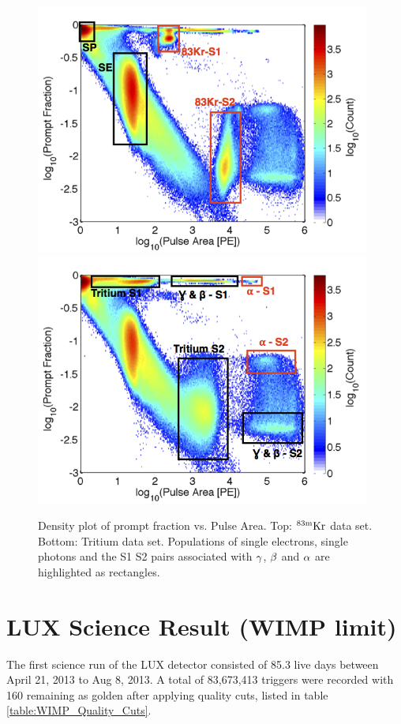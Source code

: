  \begin{figure}[h!]\centering
\includegraphics[width=110mm]{Chapter_LUX_Det/Kr_83_Density_text.png}
\includegraphics[width=110mm]{Chapter_LUX_Det/T_Density_text.png}
\caption{Density plot of prompt fraction vs. Pulse Area. Top: $\rm^{83m}Kr$ data set. Bottom: Tritium data set. Populations of single electrons, single photons and the S1 S2 pairs associated with $\rm \gamma$, $\rm \beta$ and $\rm \alpha$ are highlighted as rectangles.}
\label{fig:Prompt_Fraction}
\end{figure}


\section{LUX Science Result (WIMP limit)}

The first science run of the LUX detector consisted of 85.3 live days between April 21, 2013 to Aug 8, 2013. A total of 83,673,413 triggers were recorded with 160 remaining as golden after applying quality cuts, listed in table \ref{table:WIMP_Quality_Cuts}.  

